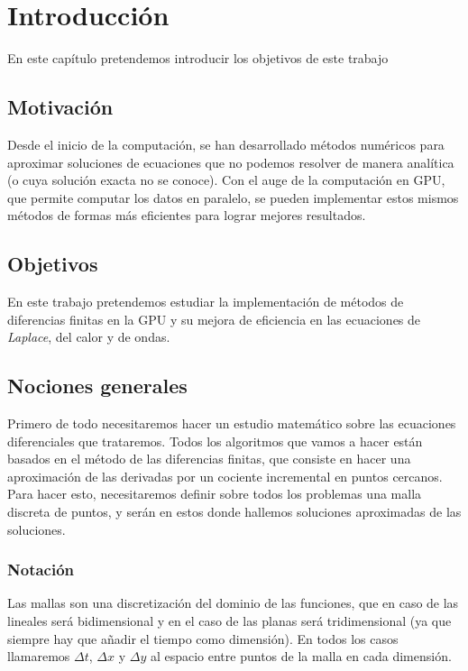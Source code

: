 \chapter{Introducción}
\label{cap:introduccion}

\begin{resumen}
	En este capítulo pretendemos introducir los objetivos de este trabajo
\end{resumen}

\section{Motivación}
Desde el inicio de la computación, se han desarrollado métodos numéricos para aproximar soluciones de ecuaciones que no podemos resolver de manera analítica (o cuya solución exacta no se conoce). Con el auge de la computación en \ac{GPU}, que permite computar los datos en paralelo, se pueden implementar estos mismos métodos de formas más eficientes para lograr mejores resultados.


\section{Objetivos}
En este trabajo pretendemos estudiar la implementación de métodos de diferencias finitas en la \ac{GPU} y su mejora de eficiencia en las ecuaciones de \emph{Laplace}, del calor y de ondas.


\section{Nociones generales}
Primero de todo necesitaremos hacer un estudio matemático sobre las ecuaciones diferenciales que trataremos. Todos los algoritmos que vamos a hacer están basados en el método de las diferencias finitas, que consiste en hacer una aproximación de las derivadas por un cociente incremental en puntos cercanos. Para hacer esto, necesitaremos definir sobre todos los problemas una malla discreta de puntos, y serán en estos donde hallemos soluciones aproximadas de las soluciones.

\subsection{Notación}
Las mallas son una discretización del dominio de las funciones, que en caso de las lineales será bidimensional y en el caso de las planas será tridimensional (ya que siempre hay que añadir el tiempo como dimensión). En todos los casos llamaremos $\Delta t$, $\Delta x$ y $\Delta y$ al espacio entre puntos de la malla en cada dimensión.

